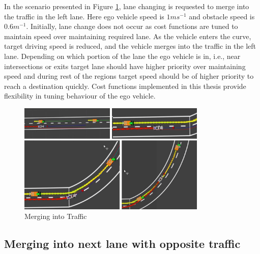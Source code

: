 In the scenario presented in Figure \ref{merging1}, lane changing is requested to merge into the traffic in the left lane. Here ego vehicle speed is $1ms^{-1}$ and obstacle speed is $0.6m^{-1}$. Initially, lane change does not occur as cost functions are tuned to maintain speed over maintaining required lane. As the vehicle enters the curve, target driving speed is reduced, and the vehicle merges into the traffic in the left lane. Depending on which portion of the lane the ego vehicle is in, i.e., near intersections or exits target lane should have higher priority over maintaining speed and during rest of the regions target speed should be of higher priority to reach a destination quickly. Cost functions implemented in this thesis provide flexibility in tuning behaviour of the ego vehicle. 

\begin{figure}[h]
    \centering
    \includegraphics[width=0.8\textwidth]{Images/evaluation/merging1.jpg}
    \caption{Merging into Traffic}
    \label{merging1}
\end{figure}

\fi

\subsection{Merging into next lane with opposite traffic}

